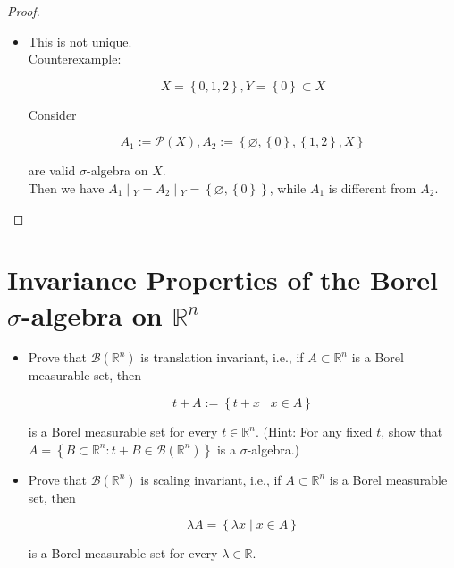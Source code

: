 \documentclass{qlnotes-export}
\begin{document}
\begin{proof}
\begin{itemize}
\begin{enumerate}
    \[\left( {\bigcup\limits_{n = 1}^{\infty}E_{n}} \right) \cap Y = \bigcup\limits_{n = 1}^{\infty}(E_{n} \cap Y) \in \mathcal{B},\]

    since \(\mathcal{B}\) is a \(\sigma\)-algebra on \(Y\). Therefore, \(\bigcup_{n = 1}^{\infty}E_{n} \in \mathcal{A}\).
  \end{enumerate}
\item
  This is not unique.\\
  Counterexample:

  \[X = \left\{ {0,1,2} \right\},Y = \left\{ 0 \right\} \subset X\]

  Consider

  \[A_{1} := \mathcal{P}(X),A_{2} := \left\{ {\varnothing,\left\{ 0 \right\},\left\{ {1,2} \right\},X} \right\}\]

  are valid \(\sigma\)-algebra on \(X\).\\
  Then we have \(\left. A_{1} \middle| {}_{Y} = A_{2} \middle| {}_{Y} = \left\{ {\varnothing,\left\{ 0 \right\}} \right\} \right.\), while \(A_{1}\) is different from \(A_{2}\).
\end{itemize}

\end{proof}

\section{\texorpdfstring{Invariance Properties of the Borel \(\sigma\)-algebra on \({\mathbb{R}}^{n}\)}{Invariance Properties of the Borel \textbackslash sigma-algebra on \{\textbackslash mathbb\{R\}\}\^{}\{n\}}}\label{invariance-properties-of-the-borel-sigma-algebra-on-mathbbrn}

\begin{itemize}
\item
  Prove that \(\mathcal{B}({\mathbb{R}}^{n})\) is translation invariant, i.e., if \(A \subset {\mathbb{R}}^{n}\) is a Borel measurable set, then

  \[t + A := \left\{ {t + x \mid x \in A} \right\}\]

  is a Borel measurable set for every \(t \in {\mathbb{R}}^{n}\). (Hint: For any fixed \(t\), show that \(A = \left\{ {B \subset {\mathbb{R}}^{n}:t + B \in \mathcal{B}({\mathbb{R}}^{n})} \right\}\) is a \(\sigma\)-algebra.)
\item
  Prove that \(\mathcal{B}({\mathbb{R}}^{n})\) is scaling invariant, i.e., if \(A \subset {\mathbb{R}}^{n}\) is a Borel measurable set, then

  \[\lambda A = \left\{ {\lambda x \mid x \in A} \right\}\]

  is a Borel measurable set for every \(\lambda \in {\mathbb{R}}\).
\end{itemize}
\end{document}

